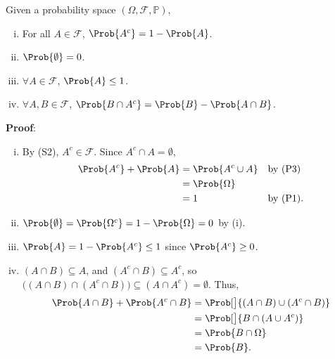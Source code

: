\begin{Proposition}{}{}
    Given a probability space $ (\Omega,\mathcal{F},\mathbb{P}) $,
    \begin{enumerate}[(i)]
        \item For all $ A\in\mathcal{F} $, $ \Prob{A^c}=1-\Prob{A} $.
        \item $ \Prob{\emptyset}=0 $.
        \item $ \forall A\in\mathcal{F} $, $ \Prob{A}\le 1 $.
        \item $ \forall A,B\in\mathcal{F} $,
              $ \Prob{B\cap A^c}=\Prob{B}-\Prob{A\cap B} $.
    \end{enumerate}
    \tcblower{}
    \textbf{Proof}:
    \begin{enumerate}[(i)]
        \item By (S2), $ A^c\in\mathcal{F} $. Since $ A^c\cap A=\emptyset $,
              \begin{align*}
                  \Prob{A^c}+\Prob{A}
                   & =\Prob{A^c\cup A} &  & \text{by (P3)}  \\
                   & =\Prob{\Omega}                         \\
                   & =1                &  & \text{by (P1)}.
              \end{align*}
        \item $ \Prob{\emptyset}=\Prob{\Omega^c}=1-\Prob{\Omega}=0 $ by (i).
        \item $ \Prob{A}=1-\Prob{A^c}\le 1 $ since $ \Prob{A^c}\ge 0 $.
        \item $ (A\cap B)\subseteq A $, and $ (A^c\cap B)\subseteq A^c $,
              so $ \bigl((A\cap B)\cap (A^c\cap B)\bigr)\subseteq (A\cap A^c)=\emptyset $.
              Thus,
              \begin{align*}
                  \Prob{A\cap B}+\Prob{A^c\cap B}
                   & =\Prob[\big]{(A\cap B)\cup (A^c\cap B)} \\
                   & =\Prob[\big]{B\cap (A\cup A^c)}         \\
                   & =\Prob{B\cap \Omega}                    \\
                   & =\Prob{B}.
              \end{align*}
    \end{enumerate}
\end{Proposition}
